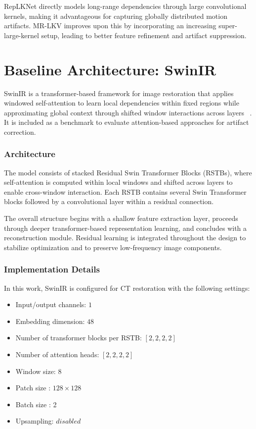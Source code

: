 RepLKNet directly models long-range dependencies through large convolutional kernels, making it advantageous for capturing globally distributed motion artifacts. MR-LKV improves upon this by incorporating an increasing super-large-kernel setup, leading to better feature refinement and artifact suppression. 


 \section{Baseline Architecture: SwinIR}

SwinIR is a transformer-based framework for image restoration that applies windowed self-attention to learn local dependencies within fixed regions while approximating global context through shifted window interactions across layers ~\cite{liang2021swinir}. It is included as a benchmark to evaluate attention-based approaches for artifact correction.
\subsubsection{Architecture}

The model consists of stacked Residual Swin Transformer Blocks (RSTBs), where self-attention is computed within local windows and shifted across layers to enable cross-window interaction. Each RSTB contains several Swin Transformer blocks followed by a convolutional layer within a residual connection. 

The overall structure begins with a shallow feature extraction layer, proceeds through deeper transformer-based representation learning, and concludes with a reconstruction module. Residual learning is integrated throughout the design to stabilize optimization and to preserve low-frequency image components.

\subsubsection{Implementation Details}

In this work, SwinIR is configured for CT restoration with the following settings:

\begin{itemize}
    \item Input/output channels: $1$
    \item Embedding dimension: $48$
    \item Number of transformer blocks per RSTB: $[2, 2, 2, 2]$
    \item Number of attention heads: $[2, 2, 2, 2]$
    \item Window size: $8$
    \item Patch size : $128 \times 128$
    \item Batch size : 2
    \item Upsampling: $disabled$
\end{itemize}

